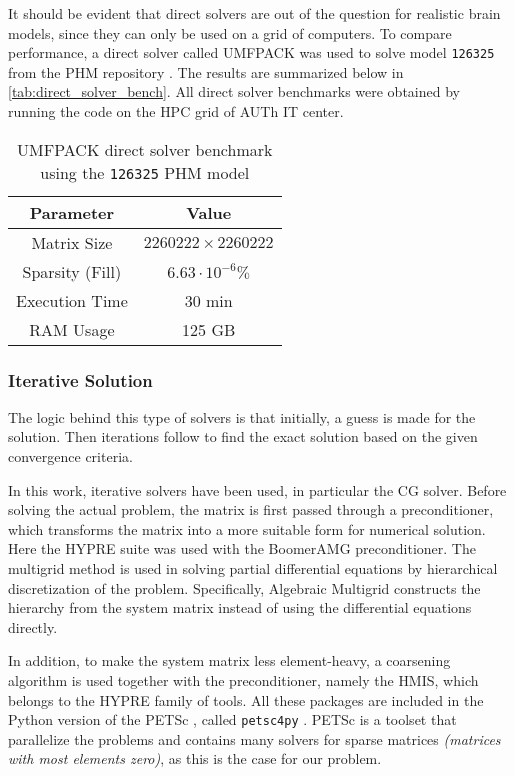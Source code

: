 It should be evident that direct solvers are out of the question for realistic brain models, since they can only be used on a grid of computers. To compare performance, a direct solver called \gls{UMFPACK} \cite{Davis2004_umfpack} was used to solve model \texttt{126325} from the \gls{PHM} repository \cite{ErikG.Lee2016}. The results are summarized below in \autoref{tab:direct_solver_bench}. All direct solver benchmarks were obtained by running the code on the \gls{HPC} grid of \gls{AUTh} \gls{IT} center.

\begin{table}[!ht]
	\centering
	\caption{\gls{UMFPACK} direct solver benchmark using the \texttt{126325} \gls{PHM} model}
	\label{tab:direct_solver_bench}
	\begin{tabular}{|c|c|}
		\hline
		\rowcolor[HTML]{C0C0C0} 
		\textbf{Parameter} & \textbf{Value} \\ \hline
		Matrix Size & $2260222\times 2260222$ \\ \hline
		Sparsity (Fill) & $6.63\cdot 10^{-6}\%$ \\ \hline
		Execution Time & 30 min \\ \hline
		RAM Usage & 125 GB \\ \hline
	\end{tabular}
\end{table}

\subsubsection{Iterative Solution}
\label{subsec:iterative_solvers}

The logic behind this type of solvers is that initially, a guess is made for the solution. Then iterations follow to find the exact solution based on the given convergence criteria.

In this work, iterative solvers have been used, in particular the \gls{CG} solver. Before solving the actual problem, the matrix is first passed through a preconditioner, which transforms the matrix into a more suitable form for numerical solution. Here the \gls{HYPRE} \cite{hypre-web-page} suite was used with the Boomer\gls{AMG} \cite[chapter 4]{McCormick1987_amg} preconditioner. The multigrid method is used in solving partial differential equations by hierarchical discretization of the problem. Specifically, Algebraic Multigrid constructs the hierarchy from the system matrix instead of using the differential equations directly. 

In addition, to make the system matrix less element-heavy, a coarsening algorithm is used together with the preconditioner, namely the \gls{HMIS}, which belongs to the \gls{HYPRE} family of tools. All these packages are included in the Python version of the \gls{PETSc} \cite{petsc-web-page,petsc-user-ref,petsc-efficient}, called \texttt{petsc4py} \cite{Dalcin2011}. \gls{PETSc} is a toolset that parallelize the problems and contains many solvers for sparse matrices \textit{(matrices with most elements zero)}, as this is the case for our problem.

